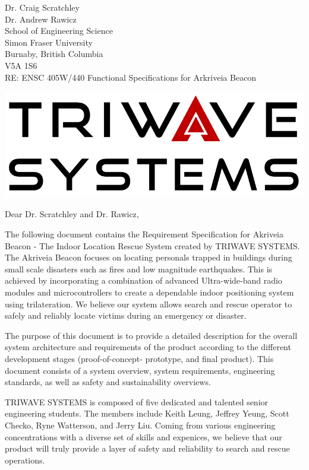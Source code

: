 \documentclass[11pt]{letter}
\date{June 09, 2019}
\begin{document}
\begin{letter}{
Dr. Craig Scratchley\\
Dr. Andrew Rawicz\\
School of Engineering Science\\
Simon Fraser University\\
Burnaby, British Columbia\\
V5A 1S6\\
\bigskip
RE: ENSC 405W/440 Functional Specifications for Arkriveia Beacon\\
}


\begin{center}
\includegraphics[scale=0.25]{./images/logo_W.png}
\end{center}


\opening{Dear Dr. Scratchley and Dr. Rawicz,}

\medskip
The following document contains the Requirement Specification for Akriveia Beacon - The Indoor Location Rescue System created by TRIWAVE SYSTEMS. The Akriveia Beacon focuses on locating personals trapped in buildings during small scale disasters such as fires and low magnitude earthquakes. This is achieved by incorporating a combination of advanced Ultra-wide-band radio modules and microcontrollers to create a dependable indoor positioning system using trilateration. We believe our system allows search and rescue operator to safely and reliably locate victims during an emergency or disaster.

\medskip
The purpose of this document is to provide a detailed description for the overall system architecture and requirements of the product according to the different development stages (proof-of-concept- prototype, and final product). This document consists of a system overview, system requirements, engineering standards, as well as safety and sustainability overviews.

\medskip
TRIWAVE SYSTEMS is composed of five dedicated and talented senior engineering students. The members include Keith Leung, Jeffrey Yeung, Scott Checko, Ryne Watterson, and Jerry Liu. Coming from various engineering concentrations with a diverse set of skills and expenices, we believe that our product will truly provide a layer of safety and reliability to search and rescue operations.


\end{letter}
\end{document}
